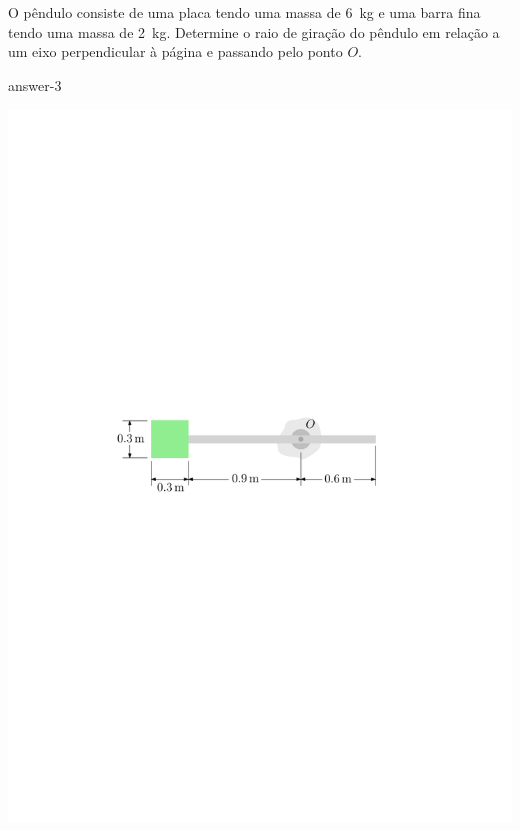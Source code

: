 \item O pêndulo consiste de uma placa tendo uma massa de \SI{6}{\kilogram} e uma barra fina tendo uma massa de \SI{2}{\kilogram}. Determine o raio de giração do pêndulo em relação a um eixo perpendicular à página e passando pelo ponto $O$.

{answer-3}

\vspace{-1cm}
\begin{flushright}
	\includegraphics[scale=.9]{../../images/draw_3}
\end{flushright}